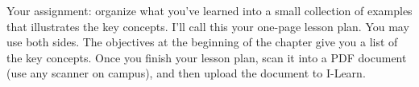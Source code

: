 \begin{problem} 
Your assignment: organize what you've learned into a small collection of examples that illustrates the key concepts. I'll call this your one-page lesson plan. You may use both sides. The objectives at the beginning of the chapter give you a list of the key concepts. Once you finish your lesson plan, scan it into a PDF document (use any scanner on campus), and then upload the document to I-Learn.
\end{problem}





